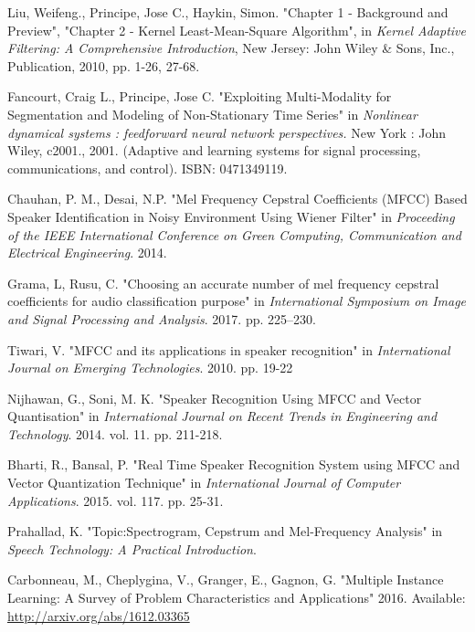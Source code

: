 \documentclass[conference]{IEEEtran}
\begin{document}
\begin{thebibliography}{00}
Liu, Weifeng., Principe, Jose C., Haykin, Simon. "Chapter 1 - Background and Preview", "Chapter 2 - Kernel Least-Mean-Square Algorithm", in \textit{Kernel Adaptive Filtering: A Comprehensive Introduction}, New Jersey: John Wiley \& Sons, Inc., Publication, 2010, pp. 1-26, 27-68.

Fancourt, Craig L., Principe, Jose C. "Exploiting Multi-Modality for Segmentation and Modeling of Non-Stationary Time Series" in \textit{Nonlinear dynamical systems : feedforward neural network perspectives.} New York : John Wiley, c2001., 2001. (Adaptive and learning systems for signal processing, communications, and control). ISBN: 0471349119.

Chauhan, P. M., Desai, N.P. "Mel Frequency Cepstral Coefficients (MFCC) Based Speaker Identification in Noisy Environment Using Wiener Filter" in \textit{Proceeding of the IEEE International Conference on Green Computing, Communication and Electrical Engineering}. 2014.

Grama, L, Rusu, C. "Choosing an accurate number of mel frequency cepstral coefficients for audio classification purpose" in \textit{International Symposium on Image and Signal Processing and Analysis}. 2017. pp. 225--230.

Tiwari, V. "MFCC and its applications in speaker recognition" in \textit{International Journal on Emerging Technologies}. 2010. pp. 19-22

Nijhawan, G., Soni, M. K. "Speaker Recognition Using MFCC and Vector Quantisation" in \textit{International Journal on Recent Trends in Engineering and Technology}. 2014. vol. 11. pp. 211-218.

Bharti, R., Bansal, P. "Real Time Speaker Recognition System using MFCC and Vector Quantization Technique" in \textit{International Journal of Computer Applications}. 2015. vol. 117. pp. 25-31.

Prahallad, K. "Topic:Spectrogram, Cepstrum and Mel-Frequency Analysis" in \textit{Speech Technology: A Practical Introduction}.

Carbonneau, M., Cheplygina, V., Granger, E., Gagnon, G. "Multiple Instance Learning: A Survey of Problem Characteristics and Applications" 2016.  Available: \url{http://arxiv.org/abs/1612.03365}


\end{thebibliography}
\end{document}
